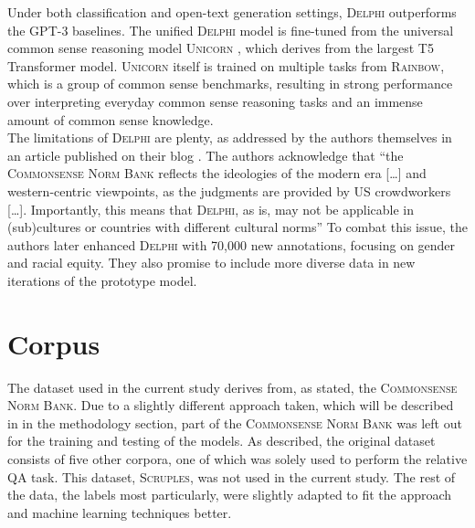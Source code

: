 \documentclass[final]{clv3} %
\begin{document}
Under both classification and open-text generation settings, \textsc{Delphi} outperforms the GPT-3 baselines. The unified \textsc{Delphi} model is fine-tuned from the universal common sense reasoning model \textsc{Unicorn} \cite{lourie}, which derives from the largest T5 Transformer model. \textsc{Unicorn} itself is trained on multiple tasks from \textsc{Rainbow}, which is a group of common sense benchmarks, resulting in strong performance over interpreting everyday common sense reasoning tasks and an immense amount of common sense knowledge.\\

The limitations of \textsc{Delphi} are plenty, as addressed by the authors themselves in an article published on their blog \cite{jiang-blog}. The authors acknowledge that “the \textsc{Commonsense Norm Bank} reflects the ideologies of the modern era […] and western-centric viewpoints, as the judgments are provided by US crowdworkers […]. Importantly, this means that \textsc{Delphi}, as is, may not be applicable in (sub)cultures or countries with different cultural norms” \cite{jiang-blog} To combat this issue, the authors later enhanced \textsc{Delphi} with 70,000 new annotations, focusing on gender and racial equity. They also promise to include more diverse data in new iterations of the prototype model. 


\section{Corpus}

The dataset used in the current study derives from, as stated, the \textsc{Commonsense Norm Bank}. Due to a slightly different approach taken, which will be described in in the methodology section, part of the \textsc{Commonsense Norm Bank} was left out for the training and testing of the models. As described, the original dataset consists of five other corpora, one of which was solely used to perform the relative QA task. This dataset, \textsc{Scruples}, was not used in the current study. The rest of the data, the labels most particularly, were slightly adapted to fit the approach and machine learning techniques better. \\
\end{document}
